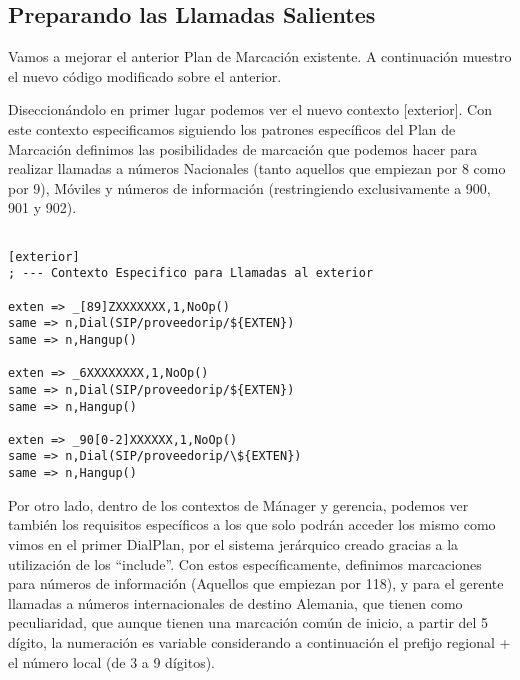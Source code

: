 \newpage

\color[rgb]{0,0,0}

\subsection{Preparando las Llamadas Salientes}

Vamos a mejorar el anterior Plan de Marcación existente. A continuación muestro el nuevo código modificado sobre el anterior.

Diseccionándolo en primer lugar podemos ver el nuevo contexto [exterior]. Con este contexto especificamos siguiendo los patrones específicos del Plan de Marcación definimos las posibilidades de marcación que podemos hacer para realizar llamadas a números Nacionales (tanto aquellos que empiezan por 8 como por 9), Móviles y números de información (restringiendo exclusivamente a 900, 901 y 902). 

\begin{lstlisting}[style=bash,title={/etc/asterisk/extensions.conf}]

[exterior]
; --- Contexto Especifico para Llamadas al exterior

exten => _[89]ZXXXXXXX,1,NoOp()
same => n,Dial(SIP/proveedorip/${EXTEN})
same => n,Hangup()

exten => _6XXXXXXXX,1,NoOp()
same => n,Dial(SIP/proveedorip/${EXTEN})
same => n,Hangup()

exten => _90[0-2]XXXXXX,1,NoOp()
same => n,Dial(SIP/proveedorip/\${EXTEN})
same => n,Hangup()

\end{lstlisting}

Por otro lado, dentro de los contextos de Mánager y gerencia, podemos ver también los requisitos específicos a los que solo podrán acceder los mismo como vimos en el primer DialPlan, por el sistema jerárquico creado gracias a la utilización de los ``include''. Con estos específicamente, definimos marcaciones para números de información (Aquellos que empiezan por 118), y para el gerente llamadas a números internacionales de destino Alemania, que tienen como peculiaridad, que aunque tienen una marcación común de inicio, a partir del 5 dígito, la numeración es variable considerando a continuación el prefijo regional + el número local (de 3 a 9 dígitos).

